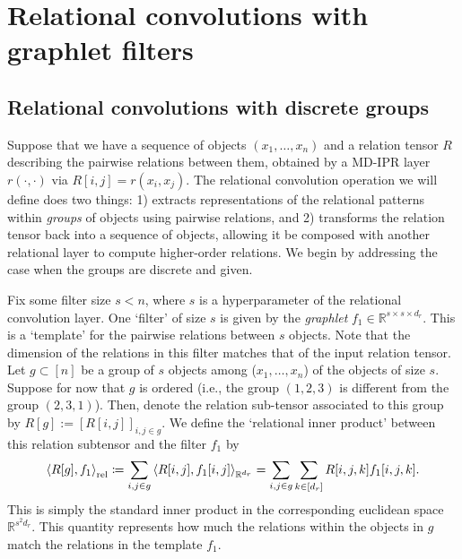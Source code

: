 \section{Relational convolutions with graphlet filters}\label{sec:relconv}

\subsection{Relational convolutions with discrete groups}
Suppose that we have a sequence of objects $(x_1, \ldots, x_n)$ and a relation tensor $R$ describing the pairwise relations between them, obtained by a MD-IPR layer $r(\cdot, \cdot)$ via $R[i,j] = r(x_i, x_j)$. The relational convolution operation we will define does two things: 1) extracts representations of the relational patterns within \textit{groups} of objects using pairwise relations, and 2) transforms the relation tensor back into a sequence of objects, allowing it be composed with another relational layer to compute higher-order relations. We begin by addressing the case when the groups are discrete and given.

Fix some filter size $s < n$, where $s$ is a hyperparameter of the relational convolution layer. One `filter' of size $s$ is given by the \textit{graphlet} $f_1 \in \mathbb{R}^{s \times s \times d_r}$. This is a `template' for the pairwise relations between $s$ objects. Note that the dimension of the relations in this filter matches that of the input relation tensor. Let $g \subset [n]$ be a group of $s$ objects among ($x_1, \ldots, x_n$) of the objects of size $s$. Suppose for now that $g$ is ordered (i.e., the group $(1, 2, 3)$ is different from the group $(2, 3, 1)$). Then, denote the relation sub-tensor associated to this group by $R[g] := [R[i,j]]_{i,j \in g}$. We define the `relational inner product' between this relation subtensor and the filter $f_1$ by
\begin{equation}
    \label{eq:relational_inner_prod_one_filt}
    \left\langle R[g], f_1 \right\rangle_\mathrm{rel} \coloneqq \sum_{i,j \in g} \left \langle R[i,j], f_1[i,j] \right\rangle_{\mathbb{R}^{d_r}} = \sum_{i,j \in g} \sum_{k \in [d_r]} R[i,j,k] f_1[i,j,k].
\end{equation}
This is simply the standard inner product in the corresponding euclidean space $\mathbb{R}^{s^2 d_r}$. This quantity represents how much the relations within the objects in $g$ match the relations in the template $f_1$.



